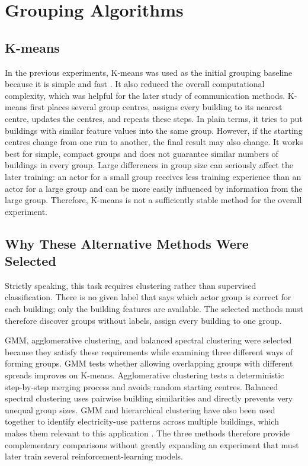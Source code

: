 \section{Grouping Algorithms}

\subsection{K-means}

In the previous experiments, K-means was used as the initial grouping baseline
because it is simple and fast \cite{kmeans1967}. It also reduced the overall
computational complexity, which was helpful for the later study of communication
methods. K-means first places several group centres, assigns every building to
its nearest centre, updates the centres, and repeats these steps. In plain terms,
it tries to put buildings with similar feature values into the same group.
However, if the starting centres change from one run to another, the final result
may also change. It works best for simple, compact groups and does not guarantee
similar numbers of buildings in every group. Large differences in group size can
seriously affect the later training: an actor for a small group receives less
training experience than an actor for a large group and can be more easily
influenced by information from the large group. Therefore, K-means is not a
sufficiently stable method for the overall experiment.


\subsection{Why These Alternative Methods Were Selected}

Strictly speaking, this task requires clustering rather than supervised
classification. There is no given label that says which actor group is correct
for each building; only the building features are available. The selected
methods must therefore discover groups without labels, assign every building to
one group.

GMM, agglomerative clustering, and balanced spectral clustering were selected
because they satisfy these requirements while examining three different ways of
forming groups. GMM tests whether allowing overlapping groups with different
spreads improves on K-means. Agglomerative clustering tests a deterministic
step-by-step merging process and avoids random starting centres. Balanced
spectral clustering uses pairwise building similarities and directly prevents
very unequal group sizes. GMM and hierarchical clustering have also been used
together to identify electricity-use patterns across multiple buildings, which
makes them relevant to this application \cite{li2018buildingprofiles}. The three
methods therefore provide complementary comparisons without greatly expanding
an experiment that must later train several reinforcement-learning models.

